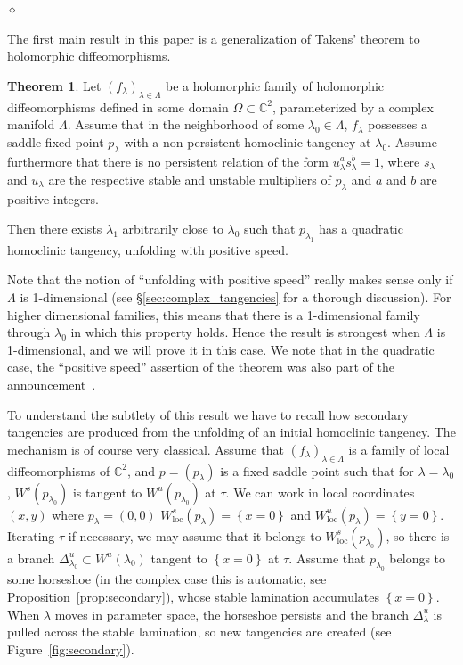 \documentclass[11pt, oneside]{amsart}
\newcommand{\C}{\mathbb{C}}
\newcommand{\set}[1]{\left\{#1\right\}}
\newcommand{\cd}{{\C^2}}
\newcommand{\la}{\lambda}
\newcommand{\lo}{{\lambda_0}}
\newcommand{\loc}{{\mathrm{loc}}}
\newcommand{\La}{\Lambda}
\newcommand{\diamant}{\medskip \begin{center}$\diamond$\end{center}\medskip}
\theoremstyle{remark}
\theoremstyle{definition}
\theoremstyle{theorem}
\newtheorem{mthmA}{Theorem}
\begin{document}
\diamant 

The first main result in this paper is a generalization of Takens' theorem 
 to   holomorphic diffeomorphisms. 

\begin{mthmA}\label{thm:quadratic}
Let $(f_\lambda)_{\lambda\in \Lambda}$ be a holomorphic family of holomorphic diffeomorphisms 
defined in some  domain $\Omega\subset \cd$,   parameterized by a complex manifold $\Lambda$. 
Assume that in the neighborhood of 
 some  $\lambda_0\in \Lambda$, $f_\la$ possesses a saddle fixed point $p_\la$ 
 with a non persistent homoclinic tangency at $\lo$.  Assume furthermore that there is no persistent relation of the form $u_\lambda^as_\lambda^b=  1$, where  
 $s_\lambda$ and $u_\lambda$ are the respective stable and unstable multipliers of $p_\lambda$ and $a$ and $b$ are positive integers. 

Then there exists $\lambda_1$ 
arbitrarily close to $\lo$  such that $p_{\lambda_1}$ has   
 a quadratic homoclinic tangency,  unfolding with positive speed. 
\end{mthmA}

Note that the notion of ``unfolding with positive speed'' really makes sense only if $\Lambda$ is 1-dimensional (see \S\ref{sec:complex_tangencies} for a thorough discussion). 
For higher dimensional families, this means that  there is a 
1-dimensional family through $\lo$ in which this property holds. Hence 
 the result is strongest when $\Lambda$ is 1-dimensional, and we will prove it in this case. We note that  in the quadratic case, the ``positive speed'' assertion of the theorem was also part of the announcement~\cite{avila-lyubich-zhang}. 
 
To understand the subtlety of this result we have to recall how secondary 
tangencies are produced from the unfolding of an initial homoclinic tangency.  The mechanism is of course very classical.  
Assume that $(f_\la)_{\la\in \La}$ is a family of local diffeomorphisms of $\cd$, and 
$p = (p_\la)$ is a fixed saddle point such that for $\la = \lo$, $W^s(p_\lo)$ is tangent to $W^u(p_\lo)$ 
at $\tau$. We can work in local coordinates $(x,y)$ where $p_\la=(0,0)$
$W^s_\loc(p_\la) = \set{x=0}$ and $W^u_\loc(p_\la)   = \set{y=0}$. Iterating $\tau$ if necessary, we may 
assume that it belongs to $W^s_\loc(p_\lo)$, so there is a branch $\Delta^u_\lo\subset W^u(\lo)$ 
tangent to $\set{x=0}$ at $\tau$. Assume that $p_\lo$ belongs to some horseshoe (in the complex case 
this is automatic, see Proposition~\ref{prop:secondary}), whose stable lamination accumulates 
$\set{x=0}$. When $\la$ moves in parameter space, the horseshoe persists and   the branch $\Delta^u_\la$ is pulled across  
 the stable lamination, so new tangencies are created (see Figure~\ref{fig:secondary}). 
\end{document}
